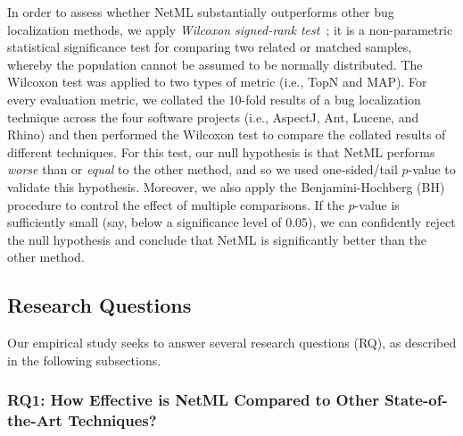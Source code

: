 In order to assess whether NetML substantially outperforms other bug localization methods, we apply \emph{Wilcoxon signed-rank test}~\cite{Wilcoxon1945}; it is a non-parametric statistical significance test for comparing two related or matched samples, whereby the population cannot be assumed to be normally distributed. The Wilcoxon test was applied to two types of metric (i.e., TopN and MAP). For every evaluation metric, we collated the 10-fold results of a bug localization technique across the four software projects (i.e., AspectJ, Ant, Lucene, and Rhino) and then performed the Wilcoxon test to compare the collated results of different techniques. For this test, our null hypothesis is that NetML performs \emph{worse} than or \emph{equal} to the other method, and so we used one-sided/tail $p$-value to validate this hypothesis. Moreover, we also apply the Benjamini-Hochberg (BH)~\cite{Benjamini1995thecontrol} procedure to control the effect of multiple comparisons. If the $p$-value is sufficiently small (say, below a significance level of $0.05$), we can confidently reject the null hypothesis and conclude that NetML is significantly better than the other method.

\subsection{Research Questions}
\label{sec:rqs}

Our empirical study seeks to answer several research questions (RQ), as described in the following subsections.

\subsubsection{RQ1: How Effective is NetML Compared to Other State-of-the-Art Techniques?}


